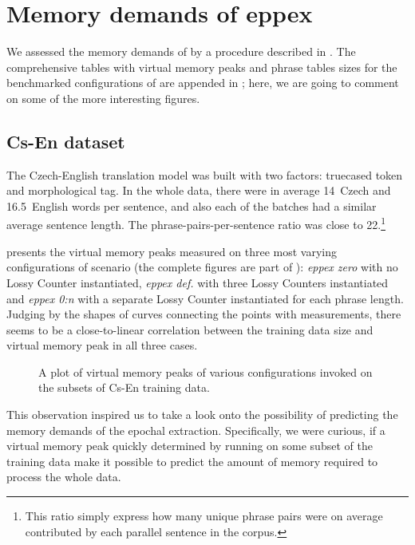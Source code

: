 \section{Memory demands of eppex}
\label{sec:eppex-memory-demands}

We assessed the memory demands of \eppex{} by a procedure described in .
The comprehensive tables with virtual memory peaks and phrase tables sizes for the benchmarked
configurations of \eppex{} are appended in ; here, we are going
to comment on some of the more interesting figures.

\subsection{Cs-En dataset}

The Czech-English translation model was built with two factors: truecased token and
morphological tag.
In the whole data, there were in average 14~Czech and 16.5~English words per sentence,
and also each of the batches had a similar average sentence length.
The phrase-pairs-per-sentence ratio was close to 22.\footnote{This ratio simply express
how many unique phrase pairs were on average contributed by each parallel sentence in
the corpus.}

 presents the virtual memory peaks measured on three most varying
configurations of \eppex{} scenario (the complete figures are part of ):
\emph{eppex zero} with no Lossy Counter instantiated,
\emph{eppex def.} with three Lossy Counters instantiated and \emph{eppex 0:n} with
a separate Lossy Counter instantiated for each phrase length.
Judging by the shapes of curves connecting the points with measurements, there seems to be
a close-to-linear correlation between the training data size and virtual memory peak in all
three cases.

\begin{figure}[!htb]
  \centering
  
  \caption{
    A plot of virtual memory peaks of various \eppex{} configurations invoked on the subsets of Cs-En training data.
  }
  \label{fig:cs-en-vm-peaks}
\end{figure}

This observation inspired us to take a look onto the possibility of predicting the memory
demands of the epochal extraction.
Specifically, we were curious, if a virtual memory peak quickly determined by running
\eppex{} on some subset of the training data make it possible to predict the amount of
memory required to process the whole data.

